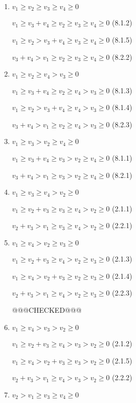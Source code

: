 \documentclass{article}
\begin{document}
\begin{enumerate}

    \item $v_1\geq{v_2}\geq{v_3}\geq{v_4}\geq{0}$

    $v_1\geq{v_3+v_4}\geq{v_2}\geq{v_3}\geq{v_4}\geq{0}$ (8.1.2)
    
    $v_1\geq{v_2}>v_3+v_4\geq{v_3}\geq{v_4}\geq{0}$ (8.1.5)
    
    $v_3+v_4>v_1\geq{v_2}\geq{v_3}\geq{v_4}\geq{0}$ (8.2.2)

    \item $v_1\geq{v_2}\geq{v_4}>v_3\geq{0}$

    $v_1\geq{v_3+v_4}\geq{v_2}\geq{v_4}>v_3\geq{0}$ (8.1.3)
    
    $v_1\geq{v_2}>v_3+v_4\geq{v_4}>v_3\geq{0}$ (8.1.4)
    
    $v_3+v_4>v_1\geq{v_2}\geq{v_4}>v_3\geq{0}$ (8.2.3)

    \item $v_1\geq{v_3}>v_2\geq{v_4}\geq{0}$

    $v_1\geq{v_3+v_4}\geq{v_3}>v_2\geq{v_4}\geq{0}$ (8.1.1)
    
    $v_3+v_4>v_1\geq{v_3}>v_2\geq{v_4}\geq{0}$ (8.2.1)

    \item $v_1\geq{v_3}\geq{v_4}>v_2\geq{0}$

$v_1\geq{v_2+v_3}\geq{v_3}\geq{v_4}>v_2\geq{0}$ (2.1.1)

$v_2+v_3>v_1\geq{v_3}\geq{v_4}>v_2\geq{0}$ (2.2.1)

    \item $v_1\geq{v_4}>v_2\geq{v_3}\geq{0}$

    $v_1\geq{v_2+v_3}\geq{v_4}>v_2\geq{v_3}\geq{0}$ (2.1.3)

    $v_1\geq{v_4}>v_2+v_3\geq{v_2}\geq{v_3}\geq{0}$ (2.1.4)

    $v_2+v_3>v_1\geq{v_4}>v_2\geq{v_3}\geq{0}$ (2.2.3)

@@@CHECKED@@@
    
\item $v_1\geq{v_4}>v_3>v_2\geq{0}$

    $v_1\geq{v_2+v_3}\geq{v_4}>v_3>v_2\geq{0}$ (2.1.2)

    $v_1\geq{v_4}>v_2+v_3\geq{v_3}>v_2\geq{0}$ (2.1.5)

    $v_2+v_3>v_1\geq{v_4}>v_3>v_2\geq{0}$ (2.2.2)

    \item $v_2>v_1\geq{v_3}\geq{v_4}\geq{0}$


\end{enumerate}
\end{document}
